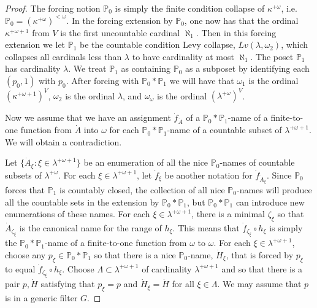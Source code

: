 \documentclass{amsart}
\theoremstyle{plain}
\theoremstyle{definition}
\theoremstyle{remark}
\theoremstyle{plain}
\theoremstyle{definition}
\theoremstyle{remark}
\begin{document}
\begin{proof}
          The forcing notion $\mathbb P_0$ is simply the finite condition
          collapse of $\kappa^{+\omega}$, i.e. $\mathbb P_0 = \left(
           \kappa^{+\omega}\right)^{<\omega}$. In the forcing extension by
           $\mathbb P_0$, one now has that the ordinal $\kappa^{+\omega+1}$
           from $V$ is the first uncountable cardinal $\aleph_1$. Then in this
           forcing extension we let $\mathbb P_1$ be the countable condition
           Levy collapse, $Lv(\lambda,\omega_2)$, which collapses all cardinals
           less than $\lambda$ to have cardinality at most $\aleph_1$. The poset
           $\mathbb P_1$ has cardinality $\lambda$. We treat
          $\mathbb P_1$ as containing $\mathbb P_0$
          as a subposet by identifying each $(p_0,1)$ with $p_0$.
          After forcing with $\mathbb P_0*\mathbb P_1$ we will have
          that $\omega_1$ is the ordinal $\left(\kappa^{+\omega+1}\right)^V$,
           $\omega_2$ is the ordinal $\lambda$, and $\omega_\omega$ is the
           ordinal $\left(\lambda^{+\omega}\right)^V$.

          \bigskip

          Now we assume that we have an assignment $\dot f_{\dot A}$ of a
           $\mathbb P_0*\mathbb P_1$-name of a finite-to-one function from
           $\dot A$ into $\omega$ for each
           $\mathbb P_0*\mathbb P_1$-name of a countable subset of
           $\lambda^{+\omega+1}$. We will obtain a contradiction.

          Let $\{ \dot A_\xi : \xi \in \lambda^{+\omega+1}\}$ be an enumeration
          of all the  nice $\mathbb P_0$-names of countable
          subsets of $\lambda^{+\omega}$. For each $\xi\in \lambda^{+\omega+1}$,
           let $\dot f_\xi$ be another notation for $\dot f_{\dot A_\xi}$.
          Since $\mathbb P_0$ forces that $\mathbb P_1$ is countably closed,
          the collection of all nice  $\mathbb P_0$-names will produce all
          the countable sets in the extension by $\mathbb P_0* \mathbb
          P_1$, but $\mathbb P_0*\mathbb P_1$ can introduce new enumerations of
          these names.
          For each $\xi\in \lambda^{+\omega+1}$,
          there is a minimal $\zeta_\xi$ so that $\dot A_{\zeta_\xi}$ is the
          canonical name for the range of $h_\xi$. This means that
           $\dot f_{\zeta_\xi} \circ h_\xi$ is simply the
           $\mathbb P_0 *\mathbb P_1$-name of a finite-to-one function from
           $\omega$ to $\omega$.
            For each $\xi\in \lambda^{+\omega+1}$,
           choose any $p_\xi \in \mathbb P_0*\mathbb P_1$ so that
           there is a nice $\mathbb P_0$-name, $\dot H_\xi$,
           that is forced by
           $p_\xi$  to equal $\dot f_{\zeta_\xi}\circ h_\xi$.
            Choose $\Lambda\subset \lambda^{+\omega+1}$
            of cardinality $\lambda^{+\omega+1}$
            and so that there is a pair $p,\dot H$
            satisfying that $p_\xi = p$ and $\dot H_\xi = \dot H$
            for all $\xi\in \Lambda$. We may assume that $p$
            is in a generic filter $  G$.



\end{proof}
\end{document}
